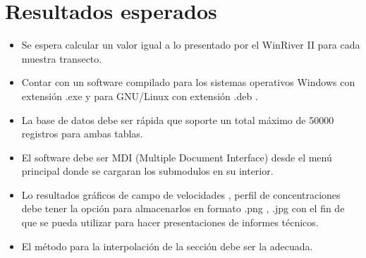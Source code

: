 \documentclass[12pt,a4paper]{report}
\begin{document}

\section{Resultados esperados}
\begin{itemize}
\item Se espera calcular un valor igual a lo presentado por el WinRiver II para cada muestra transecto.
\item Contar con un software compilado para los sistemas operativos Windows con extensión .exe y para GNU/Linux con extensión .deb .
\item La base de datos debe ser rápida que soporte un total máximo de 50000 registros para ambas tablas.
\item El software debe ser MDI (Multiple Document Interface) desde el menú principal donde se cargaran los submodulos en su interior.
\item Lo resultados gráficos de campo de velocidades , perfil de concentraciones debe tener la opción para almacenarlos en formato .png , .jpg con el fin de que se pueda utilizar para hacer presentaciones de informes técnicos.
\item El método para la interpolación de la sección debe ser la adecuada.
\end{itemize}
\end{document}
